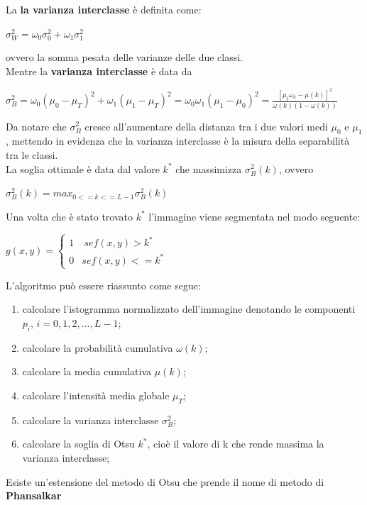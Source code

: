 La \textbf{la varianza interclasse} è definita come:
\begin{center}
    $\sigma^2_W = \omega_0 \sigma^2_0 + \omega_1 \sigma^2_1$
\end{center}
ovvero la somma pesata delle varianze delle due classi.
\\Mentre la \textbf{varianza interclasse} è data da
\begin{center}
    $\sigma^2_B = \omega_0(\mu_0 - \mu_T)^2 + \omega_1(\mu_1 - \mu_T)^2 = \omega_0\omega_1(\mu_1-\mu_0)^2 = \frac{[\mu_t \omega_k - \mu(k)]^2}{\omega(k)(1-\omega(k))}$
\end{center}
Da notare che $\sigma^2_B$  cresce all'aumentare della distanza tra i due valori medi $\mu_0$ e $\mu_1$, mettendo in evidenza che la varianza interclasse è la misura della separabilità tra le classi.
\\
La soglia ottimale è data dal valore $k^*$ che massimizza $\sigma^2_B(k)$, ovvero
\begin{center}
    $\sigma^2_B(k) = max_{0<=k<=L-1} \sigma^2_B(k)$
\end{center}
Una volta che è stato trovato $k^*$ l'immagine viene segmentata nel modo seguente:
\begin{center}
    $
        g(x,y) = \left\{ \begin{array}{cl}
            1 & \ se f(x,y) > k^* \\
            0 & se f(x,y) <= k^*
        \end{array} \right.
    $
\end{center}
L'algoritmo può essere riassunto come segue:
\begin{enumerate}
    \item calcolare l'istogramma normalizzato dell'immagine denotando
          le componenti $p_i$, $i=0,1,2,...,L-1$;
    \item calcolare la probabilità cumulativa $\omega(k)$;
    \item calcolare la media cumulativa $\mu(k)$;
    \item calcolare l'intensità media globale $\mu_T$;
    \item calcolare la varianza interclasse $\sigma^2_B$;
    \item  calcolare la soglia di Otsu $k^*$, cioè il valore di k che rende
          massima la varianza interclasse;
\end{enumerate}
Esiste un'estensione del metodo di Otsu che prende il nome di
metodo di \textbf{Phansalkar}

